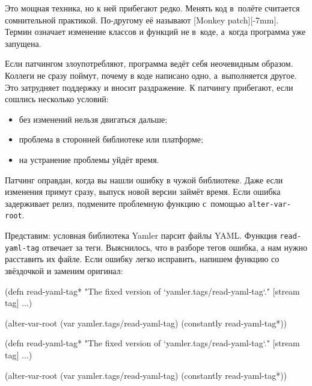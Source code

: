 Это мощная техника, но к ней прибегают редко. Менять код в~полёте считается
сомнительной практикой. По-другому её называют [Monkey patch][-7mm]. Термин означает изменение классов и функций не в~коде, а~когда программа уже запущена.

Если патчингом злоупотребляют, программа ведёт себя неочевидным
образом. Коллеги не сразу поймут, почему в коде написано одно, а~выполняется
другое. Это затрудняет поддержку и вносит раздражение. К патчингу прибегают,
если сошлись несколько условий:

\begin{itemize}

\item
  без изменений нельзя двигаться дальше;

\item
  проблема в сторонней библиотеке или платформе;

\item
  на устранение проблемы уйдёт время.

\end{itemize}

Патчинг оправдан, когда вы нашли ошибку в чужой библиотеке. Даже если изменения
примут сразу, выпуск новой версии займёт время. Если ошибка задерживает релиз,
подмените проблемную функцию с~помощью \verb|alter-var-root|.

Представим: условная библиотека Yamler парсит файлы YAML. Функция
\verb|read-yaml-tag| отвечает за теги. Выяснилось, что в разборе тегов ошибка,
а нам нужно расставить их файле. Если ошибку легко исправить, напишем функцию со
звёздочкой и заменим оригинал:

\ifx\DEVICETYPE\MOBILE

\begin{english}
  \begin{clojure}
(defn read-yaml-tag*
  "The fixed version of
  `yamler.tags/read-yaml-tag`."
  [stream tag]
  ...)

(alter-var-root
 (var yamler.tags/read-yaml-tag)
 (constantly read-yaml-tag*))
  \end{clojure}
\end{english}

\else

\begin{english}
  \begin{clojure}
(defn read-yaml-tag*
  "The fixed version of `yamler.tags/read-yaml-tag`."
  [stream tag]
  ...)

(alter-var-root
 (var yamler.tags/read-yaml-tag)
 (constantly read-yaml-tag*))
  \end{clojure}
\end{english}

